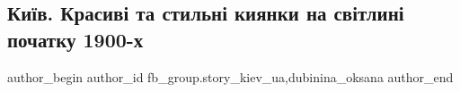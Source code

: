  
 
 
 
 

\subsection{Київ. Красиві та стильні киянки на світлині початку 1900-х}
\label{sec:25_01_2023.fb.fb_group.story_kiev_ua.1.ki_v__krasiv__ta_sti}
 
\ifcmt
 author_begin
   author_id fb_group.story_kiev_ua,dubinina_oksana
 author_end
\fi
